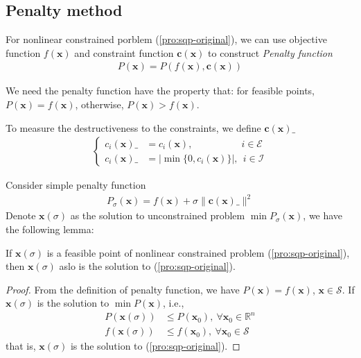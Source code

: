 \par
\subsection{Penalty method}
\par
For nonlinear constrained porblem (\ref{pro:sqp-original}),
we can use objective function $f(\mathbf{x})$
and constraint function $\mathbf{c}(\mathbf{x})$
to construct \emph{Penalty function}
\begin{align}
    P(\mathbf{x}) = P(f(\mathbf{x}), \mathbf{c}(\mathbf{x}))
\end{align}

We need the penalty function have the property that:
for feasible points, $P(\mathbf{x}) = f(\mathbf{x})$,
otherwise, $P(\mathbf{x}) > f(\mathbf{x})$.
\par
To measure the destructiveness to the constraints,
we define $\mathbf{c}(\mathbf{x})\_$
\begin{align}
    \left\{
        \begin{array}{ll}
            c_i(\mathbf{x})\_ &= c_i(\mathbf{x}), \quad \quad \quad \quad \quad i\in \mathcal{E} \\
            c_i(\mathbf{x})\_ &= |\min \{ 0, c_i(\mathbf{x}) \}|,\ \ i \in \mathcal{I}
        \end{array}\right.
\end{align}

Consider simple penalty function
\begin{align}
    P_\sigma(\mathbf{x}) = f(\mathbf{x}) + 
    \sigma \parallel \mathbf{c}(\mathbf{x})\_ \parallel^2
\end{align}
Denote $\mathbf{x}(\sigma)$ as the solution to unconstrained
problem $\min P_\sigma(\mathbf{x})$, we have the following lemma:

\begin{lemma}
    If $\mathbf{x}(\sigma)$ is a feasible point of nonlinear
    constrained problem \textnormal{(\ref{pro:sqp-original})}, then $\mathbf{x}(\sigma)$
    aslo is the solution to \textnormal{(\ref{pro:sqp-original})}.
\end{lemma}

\begin{proof}
    From the definition of penalty function,
    we have $P(\mathbf{x}) = f(\mathbf{x})$,
    $\mathbf{x} \in \mathcal{S}$.
    If $\mathbf{x}(\sigma)$ is the solution to 
    $\min P(\mathbf{x})$, i.e.,
    \begin{align}
        P(\mathbf{x}(\sigma)) &\leq P(\mathbf{x}_0), \ \forall
        \mathbf{x}_0 \in \mathbb{R}^{n} \\
        f(\mathbf{x}(\sigma)) &\leq f(\mathbf{x}_0), \ \forall
        \mathbf{x}_0 \in \mathcal{S}
    \end{align}
that is, $\mathbf{x}(\sigma)$ is the solution to (\ref{pro:sqp-original}).

\end{proof}

